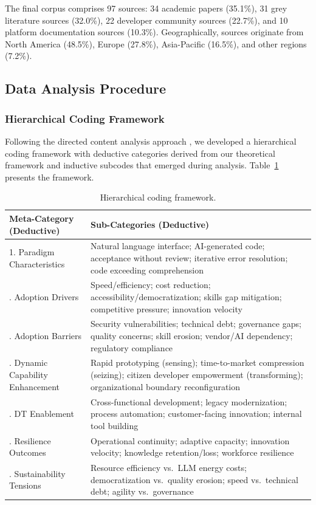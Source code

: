 \documentclass[preprint,12pt,authoryear]{elsarticle}
\begin{document}
The final corpus comprises 97 sources: 34 academic papers (35.1\%), 31 grey literature sources (32.0\%), 22 developer community sources (22.7\%), and 10 platform documentation sources (10.3\%). Geographically, sources originate from North America (48.5\%), Europe (27.8\%), Asia-Pacific (16.5\%), and other regions (7.2\%).


\subsection{Data Analysis Procedure}
\label{sec:analysis}

\subsubsection{Hierarchical Coding Framework}

Following the directed content analysis approach \citep{Hsieh2005}, we developed a hierarchical coding framework with deductive categories derived from our theoretical framework and inductive subcodes that emerged during analysis. Table~\ref{tab:coding} presents the framework.

\begin{table}[htbp]
\centering
\caption{Hierarchical coding framework.}
\label{tab:coding}
\small
\begin{tabularx}{\textwidth}{@{}lX@{}}
\toprule
\textbf{Meta-Category (Deductive)} & \textbf{Sub-Categories (Deductive)} \\
\midrule
1. Paradigm Characteristics & Natural language interface; AI-generated code; acceptance without review; iterative error resolution; code exceeding comprehension \\
\addlinespace
2. Adoption Drivers & Speed/efficiency; cost reduction; accessibility/democratization; skills gap mitigation; competitive pressure; innovation velocity \\
\addlinespace
3. Adoption Barriers & Security vulnerabilities; technical debt; governance gaps; quality concerns; skill erosion; vendor/AI dependency; regulatory compliance \\
\addlinespace
4. Dynamic Capability Enhancement & Rapid prototyping (sensing); time-to-market compression (seizing); citizen developer empowerment (transforming); organizational boundary reconfiguration \\
\addlinespace
5. DT Enablement & Cross-functional development; legacy modernization; process automation; customer-facing innovation; internal tool building \\
\addlinespace
6. Resilience Outcomes & Operational continuity; adaptive capacity; innovation velocity; knowledge retention/loss; workforce resilience \\
\addlinespace
7. Sustainability Tensions & Resource efficiency vs.\ LLM energy costs; democratization vs.\ quality erosion; speed vs.\ technical debt; agility vs.\ governance \\
\bottomrule
\end{tabularx}
\end{table}
\end{document}

